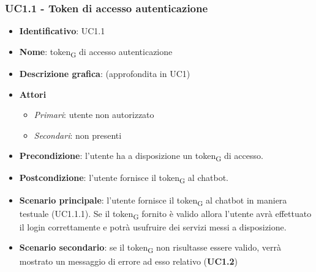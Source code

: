 \subsubsection{UC1.1 - Token di accesso autenticazione}
\begin{itemize}
    \item \textbf{Identificativo}: UC1.1
    \item \textbf{Nome}: token\textsubscript{G} di accesso autenticazione
    \item \textbf{Descrizione grafica}: (approfondita in UC1)
    \item \textbf{Attori}
 \begin{itemize} 
    \item \textit{Primari}: utente non autorizzato
    \item \textit{Secondari}: non presenti
 \end{itemize}
 \item \textbf{Precondizione}: l'utente ha a disposizione un token\textsubscript{G} di accesso.
 \item \textbf{Postcondizione}: l'utente fornisce il token\textsubscript{G} al chatbot.
 \item \textbf{Scenario principale}: l'utente fornisce il token\textsubscript{G} al chatbot in maniera testuale (UC1.1.1). Se il token\textsubscript{G} fornito è valido allora l'utente avrà effettuato il login correttamente e potrà usufruire dei servizi messi a disposizione. 
 \item \textbf{Scenario secondario}: se il token\textsubscript{G} non risultasse essere valido, verrà mostrato un messaggio di errore ad esso relativo (\textbf{UC1.2})
\end{itemize}

